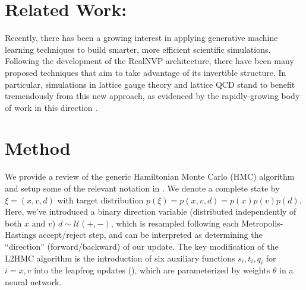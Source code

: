 \documentclass{article} %
\begin{document}
\section{\label{sec:related_work}Related Work:}
Recently, there has been a growing interest in applying generative machine learning techniques to build smarter, more efficient scientific simulations.
%
Following the development of the RealNVP \citep{dinhRealNVP} architecture, there have been many proposed techniques that aim to take advantage of its invertible structure.
%
In particular, simulations in lattice gauge theory and lattice QCD stand to benefit tremendously from this new approach, as evidenced by the rapidly-growing body of work in this direction 
\citep{%
   albergo2019flow,albergo2021introduction,favoni2020lattice,medvidovic2020generative,neklyudov2020orbital,
   neklyudov2020involutive, li2020neural,boyda2020sampling,kanwar2020equivariant,toth2019hamiltonian,
   hoffman2019neutra,wehenkel2020you,pasarica2010adaptively, dinhRealNVP,tanaka2017towards,
   rezende2020normalizing%
}.

\section{\label{sec:method}Method}
%
We provide a review of the generic Hamiltonian Monte Carlo (HMC) algorithm and setup some of the relevant notation in
.
%
We denote a complete state by \(\xi = (x, v, d)\) with target distribution \(p(\xi) = p(x, v, d) = p(x) p(v) p(d)\).
%
Here, we've introduced a binary direction variable (distributed independently of both \(x\) and \(v\))
\(d\sim\mathcal{U}(+,-)\), which is resampled following each Metropolis-Hastings accept/reject step, and can be
interpreted as determining the ``direction'' (forward/backward) of our update.
%
The key modification of the L2HMC algorithm is the introduction of six auxiliary functions \(s_{i}, t_{i}, q_{i}\) for \(i
= x, v\) into the leapfrog updates (), which are parameterized by weights \(\theta\) in a neural network.
%
\end{document}
